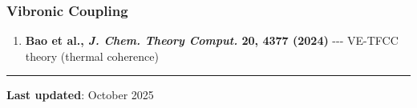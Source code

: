 \subsubsection{Vibronic Coupling}\label{vibronic-coupling}

\begin{enumerate}
\def\labelenumi{\arabic{enumi}.}
\setcounter{enumi}{7}
\tightlist
\item
  \textbf{Bao et al., \emph{J. Chem. Theory Comput.} 20, 4377 (2024)}
  -\/-\/- VE-TFCC theory (thermal coherence)
\end{enumerate}

\begin{center}\rule{0.5\linewidth}{0.5pt}\end{center}

\textbf{Last updated}: October 2025
